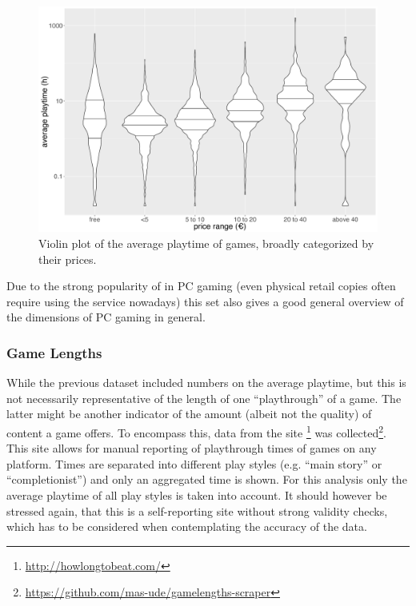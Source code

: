 
\begin{figure}[!t]
	\centering
	\includegraphics[width=1.0\columnwidth]{images/steam-cost-vs-playtime-non-sale.pdf}
	\caption{Violin plot of the average playtime of \steam games, broadly categorized by their prices.}
\label{fig:steam-cost-vs-playtime-violin}
\end{figure}



Due to the strong popularity of \steam in PC gaming (even physical retail copies often require using the service nowadays) this set also gives a good general overview of the dimensions of PC gaming in general.


\subsubsection{Game Lengths}

While the previous dataset included numbers on the average playtime, but this is not necessarily representative of the length of one ``playthrough'' of a game. The latter might be another indicator of the amount (albeit not the quality) of content a game offers. To encompass this, data from the site \hltb\footnote{\url{http://howlongtobeat.com/}} was collected\footnote{\url{https://github.com/mas-ude/gamelengths-scraper}}. This site allows for manual reporting of playthrough times of games on any platform. Times are separated into different play styles (e.g. ``main story'' or ``completionist'') and only an aggregated time is shown. For this analysis only the average playtime of all play styles is taken into account. It should however be stressed again, that this is a self-reporting site without strong validity checks, which has to be considered when contemplating the accuracy of the data.

